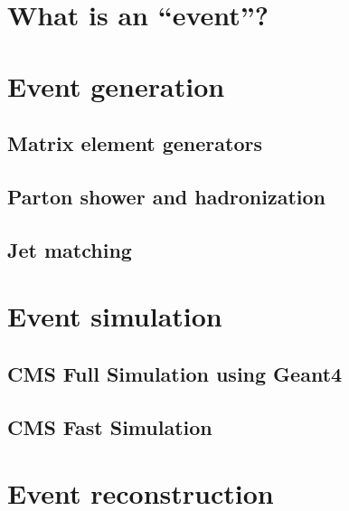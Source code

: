 \section{What is an ``event''? \label{sec:event}}




\section{Event generation \label{sec:event_generation}}


\subsection{Matrix element generators}

\subsection{Parton shower and hadronization}

\subsection{Jet matching}


\section{Event simulation \label{sec:event_simulation}}

\subsection{CMS Full Simulation using Geant4 \label{subsec:fullsim}}


\subsection{CMS Fast Simulation \label{subsec:fastsim}}


\section{Event reconstruction \label{sec:event_reconstruction}}

